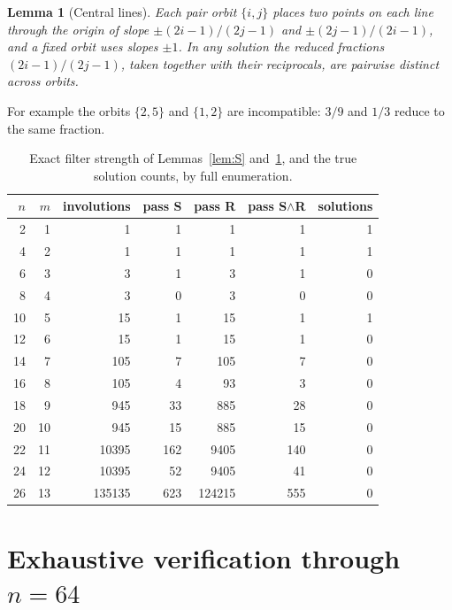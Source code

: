 \documentclass[11pt]{article}
\newtheorem{lemma}{Lemma}
\theoremstyle{remark}
\begin{document}
\begin{lemma}[Central lines]\label{lem:R}
Each pair orbit $\{i,j\}$ places two points on each line through the origin
of slope $\pm(2i-1)/(2j-1)$ and $\pm(2j-1)/(2i-1)$,
and a fixed orbit uses slopes $\pm1$.
In any solution the reduced fractions $(2i-1)/(2j-1)$,
taken together with their reciprocals,
are pairwise distinct across orbits.
\end{lemma}

For example the orbits $\{2,5\}$ and $\{1,2\}$ are incompatible:
$3/9$ and $1/3$ reduce to the same fraction.

\begin{table}[t]
\centering
\caption{Exact filter strength of Lemmas~\ref{lem:S} and~\ref{lem:R},
and the true solution counts, by full enumeration.}
\label{tab:filters}
\begin{tabular}{rrrrrrr}
\toprule
$n$ & $m$ & involutions & pass S & pass R & pass S$\wedge$R & solutions\\
\midrule
 2 &  1 &       1 &   1 &      1 &   1 & 1\\
 4 &  2 &       1 &   1 &      1 &   1 & 1\\
 6 &  3 &       3 &   1 &      3 &   1 & 0\\
 8 &  4 &       3 &   0 &      3 &   0 & 0\\
10 &  5 &      15 &   1 &     15 &   1 & 1\\
12 &  6 &      15 &   1 &     15 &   1 & 0\\
14 &  7 &     105 &   7 &    105 &   7 & 0\\
16 &  8 &     105 &   4 &     93 &   3 & 0\\
18 &  9 &     945 &  33 &    885 &  28 & 0\\
20 & 10 &     945 &  15 &    885 &  15 & 0\\
22 & 11 &   10395 & 162 &   9405 & 140 & 0\\
24 & 12 &   10395 &  52 &   9405 &  41 & 0\\
26 & 13 &  135135 & 623 & 124215 & 555 & 0\\
\bottomrule
\end{tabular}
\end{table}

\section{Exhaustive verification through $n=64$}\label{sec:search}
\end{document}
